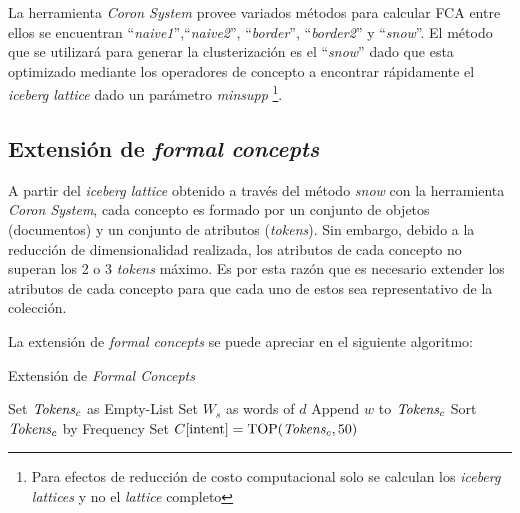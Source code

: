 \documentclass[12pt,oneside,letterpaper]{book}
\newcommand{\eng}[1]{\textit{#1}\xspace}			%
\newcommand{\abr}[1]{\textsc{#1}\xspace}           %
\theoremstyle{definition}
\begin{document}
\newpage 

La herramienta \emph{Coron System} provee variados métodos para calcular \abr{FCA} entre ellos se encuentran ``\eng{naive1}'',``\eng{naive2}'', ``\eng{border}'', ``\eng{border2}'' y ``\eng{snow}''. El método que se utilizará para generar la clusterización es el ``\eng{snow}'' dado que esta optimizado mediante los operadores de concepto a encontrar rápidamente el \eng{iceberg lattice} dado un parámetro \eng{minsupp} \cite{snowmethod}\footnote{Para efectos de reducción de costo computacional solo se calculan los \eng{iceberg lattices} y no el \eng{lattice} completo}.

\newpage

\subsection{Extensión de \eng{formal concepts}}
\label{sub:extension_de_formal_concepts}
A partir del \eng{iceberg lattice} obtenido a través del método \eng{snow} con la herramienta \eng{Coron System}, cada concepto es formado por un conjunto de objetos (documentos) y un conjunto de atributos (\eng{tokens}). Sin embargo, debido a la reducción de dimensionalidad realizada, los atributos de cada concepto no superan los 2 o 3 \eng{tokens} máximo. Es por esta razón que es necesario extender los atributos de cada concepto para que cada uno de estos sea representativo de la colección.

La extensión de \eng{formal concepts} se puede apreciar en el siguiente algoritmo:

\begin{algorithm}[h!]
	\caption{Extensión de \eng{Formal Concepts}}
	\label{alg:IntentExtension}
	\begin{algorithmic}[1]
			\State Set $\text{\emph{Tokens}}_c$ as Empty-List
			\State Set $W_s$ as words of $d$
								\State Append $w$ to $\text{\emph{Tokens}}_c$
							\EndIf
						\EndIf
					\EndIf
				\EndFor
			\EndFor
			\State Sort $\text{\emph{Tokens}}_c$ by Frequency
			\State Set $C[\text{intent}] = \text{TOP}(\text{\emph{Tokens}}_c, 50)$
		\EndFor
		\EndProcedure
	\end{algorithmic}
\end{algorithm}
\end{document}
